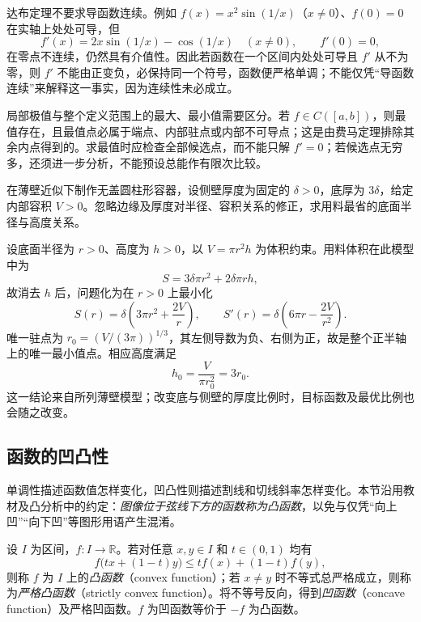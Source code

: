 达布定理不要求导函数连续。例如 $f(x)=x^2\sin(1/x)$（$x\neq0$）、$f(0)=0$ 在实轴上处处可导，但
\[
    f'(x)=2x\sin(1/x)-\cos(1/x)\quad(x\neq0),\qquad f'(0)=0,
\]
在零点不连续，仍然具有介值性。因此若函数在一个区间内处处可导且 $f'$ 从不为零，则 $f'$ 不能由正变负，必保持同一个符号，函数便严格单调；不能仅凭“导函数连续”来解释这一事实，因为连续性未必成立。

局部极值与整个定义范围上的最大、最小值需要区分。若 $f\in C([a,b])$，则最值存在，且最值点必属于端点、内部驻点或内部不可导点；这是由费马定理排除其余内点得到的。求最值时应检查全部候选点，而不能只解 $f'=0$；若候选点无穷多，还须进一步分析，不能预设总能作有限次比较。

\begin{example}
\label{ex:weighted-cylinder-material-minimization}
在薄壁近似下制作无盖圆柱形容器，设侧壁厚度为固定的 $\delta>0$，底厚为 $3\delta$，给定内部容积 $V>0$。忽略边缘及厚度对半径、容积关系的修正，求用料最省的底面半径与高度关系。
\end{example}

\begin{solve}
设底面半径为 $r>0$、高度为 $h>0$，以 $V=\pi r^2h$ 为体积约束。用料体积在此模型中为
\[
    S=3\delta\pi r^2+2\delta\pi rh,
\]
故消去 $h$ 后，问题化为在 $r>0$ 上最小化
\[
    S(r)=\delta\left(3\pi r^2+\frac{2V}{r}\right),\qquad
    S'(r)=\delta\left(6\pi r-\frac{2V}{r^2}\right).
\]
唯一驻点为 $r_0=(V/(3\pi))^{1/3}$，其左侧导数为负、右侧为正，故是整个正半轴上的唯一最小值点。相应高度满足
\[
    h_0=\frac{V}{\pi r_0^2}=3r_0.
\]
这一结论来自所列薄壁模型；改变底与侧壁的厚度比例时，目标函数及最优比例也会随之改变。
\end{solve}

\subsection{函数的凹凸性}
\label{subsec:convexity-and-concavity}

单调性描述函数值怎样变化，凹凸性则描述割线和切线斜率怎样变化。本节沿用教材及凸分析中的约定：\emph{图像位于弦线下方的函数称为凸函数}，以免与仅凭“向上凹”“向下凹”等图形用语产生混淆。

\begin{definition}
\label{def:convex-and-concave-functions}
设 $I$ 为区间，$f:I\to\mathbb{R}$。若对任意 $x,y\in I$ 和 $t\in(0,1)$ 均有
\begin{equation}
    f\bigl(tx+(1-t)y\bigr)\leq tf(x)+(1-t)f(y),
    \label{eq:convex-function-definition}
\end{equation}
则称 $f$ 为 $I$ 上的\emph{凸函数}（convex function）；若 $x\neq y$ 时不等式总严格成立，则称为\emph{严格凸函数}（strictly convex function）。将不等号反向，得到\emph{凹函数}（concave function）及严格凹函数。$f$ 为凹函数等价于 $-f$ 为凸函数。
\end{definition}

